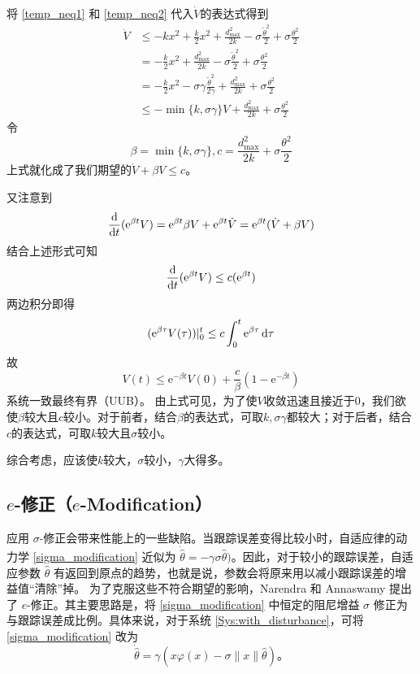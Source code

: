 将 \eqref{temp_neq1} 和 \eqref{temp_neq2} 代入$\dot{V}$的表达式得到
\begin{align*}
\dot{V} & \leq - kx^{2} + \frac{k}{2}x^{2} + \frac{d_{\max}^{2}}{2k} - \sigma\frac{{\tilde{\theta}}^{2}}{2} + \sigma\frac{\theta^{2}}{2} \\
 & = - \frac{k}{2}x^{2} + \frac{d_{\max}^{2}}{2k} - \sigma\frac{{\tilde{\theta}}^{2}}{2} + \sigma\frac{\theta^{2}}{2} \\
 & = - \frac{k}{2}x^{2} - \sigma\gamma\frac{{\tilde{\theta}}^{2}}{2\gamma} + \frac{d_{\max}^{2}}{2k} + \sigma\frac{\theta^{2}}{2} \\
 & \leq - \min\{ k,\sigma\gamma\} V + \frac{d_{\max}^{2}}{2k} + \sigma\frac{\theta^{2}}{2}
\end{align*}
令\[\beta = \min\{ k,\sigma\gamma\}, c= \frac{d_{\max}^{2}}{2k} + \sigma\frac{\theta^{2}}{2}\]
上式就化成了我们期望的$\dot{V} + \beta V \leq c$。

又注意到\[\frac{\mathop{}\!\mathrm{d}}{\mathop{}\!\mathrm{d} t}(\mathrm{e}^{\beta t} V)=\mathrm{e}^{\beta t} \beta V+\mathrm{e}^{\beta t} \dot{V}=\mathrm{e}^{\beta t}(\dot{V}+\beta V)\]
结合上述形式可知
\[\frac{\mathop{}\!\mathrm{d}}{\mathop{}\!\mathrm{d} t}(\mathrm{e}^{\beta t} V)\le c(\mathrm{e}^{\beta t})\]
两边积分即得
\[(\mathrm{e}^{\beta \tau} V(\tau))|^t_0\le c\int_0^t \mathrm{e}^{\beta\tau}\mathop{}\!\mathrm{d}\tau\]
故
\[V(t)\le \mathrm{e}^{-\beta t}V(0)+\frac{c}{\beta}(1-\mathrm{e}^{-\beta t})\]
系统一致最终有界（UUB）。
由上式可见，为了使$V$收敛迅速且接近于$0$，我们欲使\(\beta\)较大且\(c\)较小。对于前者，结合$\beta$的表达式，可取\(k,\sigma\gamma\)都较大；对于后者，结合$c$的表达式，可取\(k\)较大且\(\sigma\)较小。

综合考虑，应该使\(k\)较大，\(\sigma\)较小，\(\gamma\)大得多。

\subsection{\texorpdfstring{$e$-修正（$e$-Modification）}{e-修正（e-Modification）}}

应用 $\sigma$-修正会带来性能上的一些缺陷。当跟踪误差变得比较小时，自适应律的动力学 \eqref{sigma_modification} 近似为 $\dot{\hat{\theta}} = -\gamma \sigma\hat{\theta})$。因此，对于较小的跟踪误差，自适应参数 $\hat{\theta}$ 有返回到原点的趋势，也就是说，参数会将原来用以减小跟踪误差的增益值“清除”掉。
\newpage
为了克服这些不符合期望的影响，Narendra 和 Annaswamy 提出了 $e$-修正。其主要思路是，将 \eqref{sigma_modification} 中恒定的阻尼增益 $\sigma$ 修正为与跟踪误差成比例。具体来说，对于系统 \eqref{Sys:with_disturbance}，可将 \eqref{sigma_modification} 改为
\[
    \dot{\hat{\theta}} = \gamma \left( x\varphi(x) - \sigma \| x \| \hat{\theta} \right) \text{。}
\]

